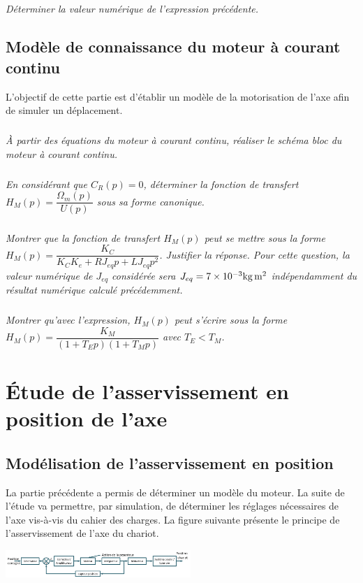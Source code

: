 \documentclass[10pt,fleqn]{article} %
\begin{document}
\begin{multicols}{2}
\subparagraph{}
\textit{Déterminer la valeur numérique de l'expression précédente.}

\subsection*{Modèle de connaissance du moteur à courant continu}
\begin{obj}
L'objectif de cette partie est d'établir un modèle de la motorisation de l'axe afin de simuler un déplacement.
\end{obj}

\subparagraph{}
\textit{À partir des équations du moteur à courant continu, réaliser le schéma bloc du moteur à courant continu.}

\subparagraph{}
\textit{En considérant que $C_R (p)=0$, déterminer la fonction de transfert $H_M (p)=\dfrac{\Omega_m (p)}{U(p)}$ sous sa forme canonique.}

\subparagraph{}
\textit{Montrer que la fonction de transfert $H_M (p)$ peut se mettre sous la forme $H_M (p)=\dfrac{K_C}{K_C K_e+RJ_{eq} p+LJ_{eq} p^2 }$. Justifier la réponse. Pour cette question, la valeur numérique de $J_{eq}$ considérée sera $J_{eq}=\num{7d-3}\si{kg.m^2}$ indépendamment du résultat numérique calculé précédemment.}

\subparagraph{}
\textit{Montrer qu'avec l'expression, $H_M (p)$ peut s'écrire sous la forme $H_M (p)=\dfrac{K_M}{(1+T_E p)(1+T_M p)}$  avec $T_E<T_M$.}

\section*{Étude de l'asservissement en position de l'axe}
\subsection*{Modélisation de l'asservissement en position}
La partie précédente a permis de déterminer un modèle du moteur. La suite de l'étude va permettre, par simulation, de déterminer les réglages nécessaires de l'axe vis-à-vis du cahier des charges. La figure suivante présente le principe de l'asservissement de l'axe du chariot.
 
\begin{center}
\includegraphics[width=7cm]{images/image9}
\end{center} 


\end{multicols}
\end{document}
